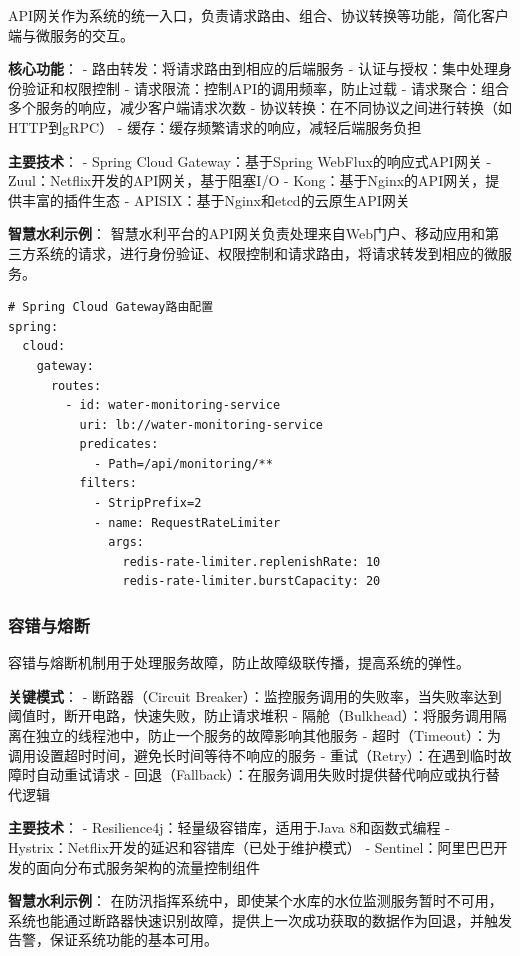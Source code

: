API网关作为系统的统一入口，负责请求路由、组合、协议转换等功能，简化客户端与微服务的交互。

\textbf{核心功能}： - 路由转发：将请求路由到相应的后端服务 -
认证与授权：集中处理身份验证和权限控制 -
请求限流：控制API的调用频率，防止过载 -
请求聚合：组合多个服务的响应，减少客户端请求次数 -
协议转换：在不同协议之间进行转换（如HTTP到gRPC） -
缓存：缓存频繁请求的响应，减轻后端服务负担

\textbf{主要技术}： - Spring Cloud Gateway：基于Spring
WebFlux的响应式API网关 - Zuul：Netflix开发的API网关，基于阻塞I/O -
Kong：基于Nginx的API网关，提供丰富的插件生态 -
APISIX：基于Nginx和etcd的云原生API网关

\textbf{智慧水利示例}：
智慧水利平台的API网关负责处理来自Web门户、移动应用和第三方系统的请求，进行身份验证、权限控制和请求路由，将请求转发到相应的微服务。

\begin{lstlisting}
# Spring Cloud Gateway路由配置
spring:
  cloud:
    gateway:
      routes:
        - id: water-monitoring-service
          uri: lb://water-monitoring-service
          predicates:
            - Path=/api/monitoring/**
          filters:
            - StripPrefix=2
            - name: RequestRateLimiter
              args:
                redis-rate-limiter.replenishRate: 10
                redis-rate-limiter.burstCapacity: 20
\end{lstlisting}

\subsubsection{容错与熔断}\label{ux5bb9ux9519ux4e0eux7194ux65ad}

容错与熔断机制用于处理服务故障，防止故障级联传播，提高系统的弹性。

\textbf{关键模式}： - 断路器（Circuit
Breaker）：监控服务调用的失败率，当失败率达到阈值时，断开电路，快速失败，防止请求堆积
-
隔舱（Bulkhead）：将服务调用隔离在独立的线程池中，防止一个服务的故障影响其他服务
- 超时（Timeout）：为调用设置超时时间，避免长时间等待不响应的服务 -
重试（Retry）：在遇到临时故障时自动重试请求 -
回退（Fallback）：在服务调用失败时提供替代响应或执行替代逻辑

\textbf{主要技术}： - Resilience4j：轻量级容错库，适用于Java
8和函数式编程 - Hystrix：Netflix开发的延迟和容错库（已处于维护模式） -
Sentinel：阿里巴巴开发的面向分布式服务架构的流量控制组件

\textbf{智慧水利示例}：
在防汛指挥系统中，即使某个水库的水位监测服务暂时不可用，系统也能通过断路器快速识别故障，提供上一次成功获取的数据作为回退，并触发告警，保证系统功能的基本可用。

